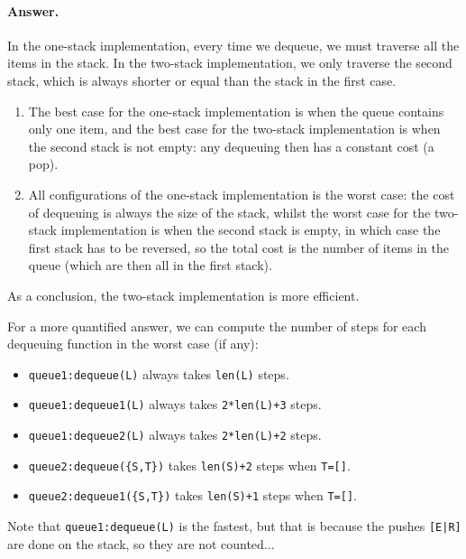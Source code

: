 \paragraph{Answer.} In the one-stack implementation, every time
we dequeue, we must traverse all the items in the stack. In the
two-stack implementation, we only traverse the second stack, which is
always shorter or equal than the stack in the first case.
\begin{enumerate}

  \item The best case for the one-stack implementation is when the
    queue contains only one item, and the best case for the two-stack
    implementation is when the second stack is not empty: any
    dequeuing then has a constant cost (a pop).

  \item All configurations of the one-stack implementation is the
    worst case: the cost of dequeuing is always the size of the stack,
    whilst the worst case for the two-stack implementation is when the
    second stack is empty, in which case the first stack has to be
    reversed, so the total cost is the number of items in the queue
    (which are then all in the first stack).

\end{enumerate}
As a conclusion, the two-stack implementation is more efficient.

\medskip

\noindent For a more quantified answer, we can compute the number of
steps for each dequeuing function in the worst case (if any):
\begin{itemize}

  \item \texttt{queue1:dequeue(L)} always takes \texttt{len(L)} steps.

  \item \texttt{queue1:dequeue1(L)} always takes \texttt{2*len(L)+3} steps.

  \item \texttt{queue1:dequeue2(L)} always takes \texttt{2*len(L)+2} steps.

  \item \texttt{queue2:dequeue(\{S,T\})} takes \texttt{len(S)+2} steps when
    \texttt{T=[]}.

  \item \texttt{queue2:dequeue1(\{S,T\})} takes \texttt{len(S)+1} steps when
  \texttt{T=[]}.

\end{itemize}
Note that \texttt{queue1:dequeue(L)} is the fastest, but that is
because the pushes \verb:[E|R]: are done on the stack, so they are not
counted...
